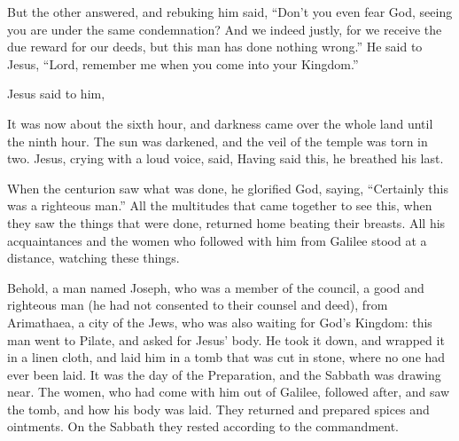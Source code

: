 {\par }{\PP {}But the other answered, and rebuking him said, “Don’t you even fear God, seeing you are under the same condemnation?
And we indeed justly, for we receive the due reward for our deeds, but this man has done nothing wrong.”
He said to Jesus, “Lord, remember me when you come into your Kingdom.”
\par }{\PP {}Jesus said to him,
{}
\par }{\PP {}It was now about the sixth hour, and darkness came over the whole land until the ninth hour.
The sun was darkened, and the veil of the temple was torn in two.
Jesus, crying with a loud voice, said,
{} Having said this, he breathed his last.
\par }{\PP {}When the centurion saw what was done, he glorified God, saying, “Certainly this was a righteous man.”
All the multitudes that came together to see this, when they saw the things that were done, returned home beating their breasts.
All his acquaintances and the women who followed with him from Galilee stood at a distance, watching these things.
\par }{\PP {}Behold, a man named Joseph, who was a member of the council, a good and righteous man
(he had not consented to their counsel and deed), from Arimathaea, a city of the Jews, who was also waiting for God’s Kingdom:
this man went to Pilate, and asked for Jesus’ body.
He took it down, and wrapped it in a linen cloth, and laid him in a tomb that was cut in stone, where no one had ever been laid.
It was the day of the Preparation, and the Sabbath was drawing near.
The women, who had come with him out of Galilee, followed after, and saw the tomb, and how his body was laid.
They returned and prepared spices and ointments. On the Sabbath they rested according to the commandment.

}
